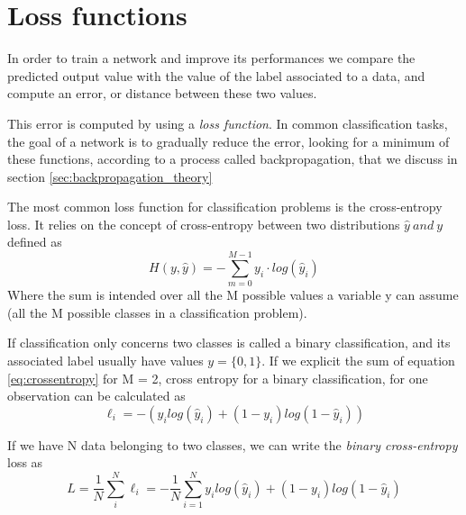 \documentclass[11pt]{report}
\begin{document}
\section{Loss functions}\label{sec:loss_functions}

In order to train a network and improve its performances we compare the predicted output value with the value of the label associated to a data, and compute an error, or distance between these two values.

This error is computed by using a \emph{loss function}.
In common classification tasks, the goal of a network is to gradually reduce the error, looking for a minimum of these functions,
according to a process called backpropagation, that we discuss in section \ref{sec:backpropagation_theory}


The most common loss function for classification problems is the cross-entropy loss.
It relies on the concept of cross-entropy between two distributions $\hat y \ and \ y$ defined as
\begin{equation}\label{eq:crossentropy}
H(y, \hat y) = -\sum_{m= 0}^{M-1} y_i \cdot log(\hat y_i)
\end{equation}
Where the sum is intended over all the M possible values a variable y can assume (all the M possible classes in a classification problem).

If classification only concerns two classes is called a binary classification, and its associated label usually have values $y = \{0, 1\}$.
If we explicit the sum of equation \ref{eq:crossentropy} for M = 2, cross entropy for a binary classification, for one observation can be calculated as
\begin{equation}
\ell_i = -(y_i log(\hat y_i) + (1-y_i)log(1-\hat y_i))
\end{equation}

If we have N data belonging to two classes, we can write the \emph{binary cross-entropy} loss as
\begin{equation}\label{eq:binary_crossentropy}
L = \frac{1}{N} \sum_i ^N \ell_i = -\frac{1}{N} \sum_{i= 1}^N y_i log(\hat y_i) + (1-y_i)log(1-\hat y_i)
\end{equation}
\end{document}
